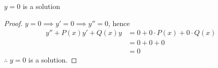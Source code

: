 $y = 0$ is a solution

\begin{proof}
    $y = 0 \implies y'=0 \implies y''= 0$, hence
    \begin{align*}
        y'' + P(x)y' + Q(x)y &= 0 + 0 \cdot P(x) + 0\cdot Q(x) \tag{substitution}\\
        &= 0 + 0 + 0 \tag{properties of zero}
        \\ &= 0 \tag{additive identity on $\R$}
    \end{align*}
    $\therefore \; y=0$ is a solution.  
\end{proof}